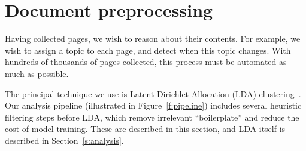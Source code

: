 

\section{Document preprocessing}\label{s:preprocessing}

Having collected pages, we wish to reason about their contents.  For
example, we wish to assign a topic to each page, and detect when this
topic changes.  With hundreds of thousands of pages collected, this
process must be automated as much as possible.

The principal technique we use is Latent Dirichlet Allocation (LDA)
clustering~\cite{lda_original2003}.  Our analysis pipeline
(illustrated in Figure~\ref{f:pipeline}) includes several heuristic
filtering steps before LDA, which remove irrelevant “boilerplate”
and reduce the cost of model training.  These are described in this
section, and LDA itself is described in Section~\ref{s:analysis}.






